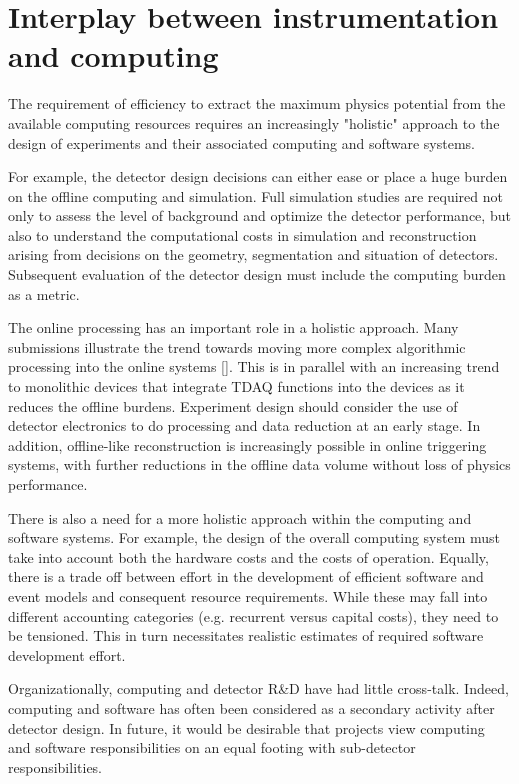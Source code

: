 \section{Interplay between instrumentation and computing}
The requirement of efficiency to extract the maximum physics potential from the available computing resources requires an increasingly "holistic" approach to the design of experiments and their associated computing and software systems. 

For example, the detector design decisions can either ease or place a huge burden on the offline computing and simulation. Full simulation studies are required not only to assess the level of background and optimize the detector performance,  but also to understand the computational costs in simulation and reconstruction arising from decisions on  the geometry, segmentation and situation of detectors. Subsequent evaluation of the detector design must include the computing burden as a metric. 

The online processing has an important role in a holistic approach. Many submissions illustrate the trend towards moving more complex algorithmic processing into the  online systems []. This is in parallel with an increasing trend to monolithic devices that integrate TDAQ functions into the devices as it reduces the offline burdens. Experiment design should consider the use of detector electronics to do  processing and data reduction at an early stage. In addition, offline-like reconstruction is increasingly possible in online triggering systems, with further reductions in the offline data volume without loss of physics performance.

There is also a need for a more holistic approach within the computing and software systems. For example, the design of the overall computing system must take into account both the hardware costs and the costs of operation. Equally, there is a trade off between effort in the development of efficient software and event models and consequent resource requirements. While these may fall into different accounting categories (e.g. recurrent versus capital costs), they need to be tensioned. This in turn necessitates realistic estimates of required software development effort.

Organizationally, computing and detector R\&D have had little cross-talk. Indeed, computing and software has often been considered as a secondary activity after detector design. In future, it would be desirable that projects view computing and software responsibilities on an equal footing with sub-detector responsibilities. 


